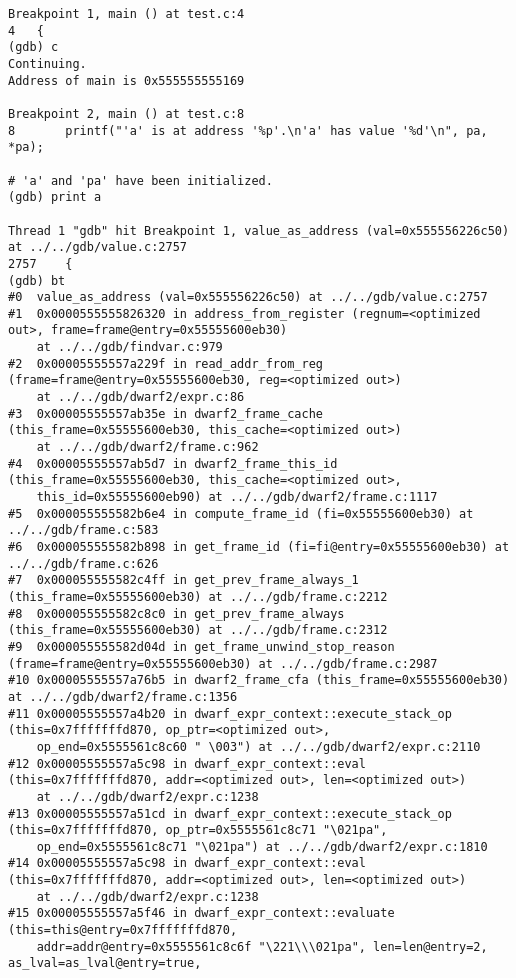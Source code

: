 \documentclass{report}
\begin{document}
\begin{verbatim}
Breakpoint 1, main () at test.c:4
4	{
(gdb) c
Continuing.
Address of main is 0x555555555169

Breakpoint 2, main () at test.c:8
8		printf("'a' is at address '%p'.\n'a' has value '%d'\n", pa, *pa);

# 'a' and 'pa' have been initialized.
(gdb) print a

Thread 1 "gdb" hit Breakpoint 1, value_as_address (val=0x555556226c50) at ../../gdb/value.c:2757
2757	{
(gdb) bt
#0  value_as_address (val=0x555556226c50) at ../../gdb/value.c:2757
#1  0x0000555555826320 in address_from_register (regnum=<optimized out>, frame=frame@entry=0x55555600eb30)
    at ../../gdb/findvar.c:979
#2  0x00005555557a229f in read_addr_from_reg (frame=frame@entry=0x55555600eb30, reg=<optimized out>)
    at ../../gdb/dwarf2/expr.c:86
#3  0x00005555557ab35e in dwarf2_frame_cache (this_frame=0x55555600eb30, this_cache=<optimized out>)
    at ../../gdb/dwarf2/frame.c:962
#4  0x00005555557ab5d7 in dwarf2_frame_this_id (this_frame=0x55555600eb30, this_cache=<optimized out>, 
    this_id=0x55555600eb90) at ../../gdb/dwarf2/frame.c:1117
#5  0x000055555582b6e4 in compute_frame_id (fi=0x55555600eb30) at ../../gdb/frame.c:583
#6  0x000055555582b898 in get_frame_id (fi=fi@entry=0x55555600eb30) at ../../gdb/frame.c:626
#7  0x000055555582c4ff in get_prev_frame_always_1 (this_frame=0x55555600eb30) at ../../gdb/frame.c:2212
#8  0x000055555582c8c0 in get_prev_frame_always (this_frame=0x55555600eb30) at ../../gdb/frame.c:2312
#9  0x000055555582d04d in get_frame_unwind_stop_reason (frame=frame@entry=0x55555600eb30) at ../../gdb/frame.c:2987
#10 0x00005555557a76b5 in dwarf2_frame_cfa (this_frame=0x55555600eb30) at ../../gdb/dwarf2/frame.c:1356
#11 0x00005555557a4b20 in dwarf_expr_context::execute_stack_op (this=0x7fffffffd870, op_ptr=<optimized out>, 
    op_end=0x5555561c8c60 " \003") at ../../gdb/dwarf2/expr.c:2110
#12 0x00005555557a5c98 in dwarf_expr_context::eval (this=0x7fffffffd870, addr=<optimized out>, len=<optimized out>)
    at ../../gdb/dwarf2/expr.c:1238
#13 0x00005555557a51cd in dwarf_expr_context::execute_stack_op (this=0x7fffffffd870, op_ptr=0x5555561c8c71 "\021pa", 
    op_end=0x5555561c8c71 "\021pa") at ../../gdb/dwarf2/expr.c:1810
#14 0x00005555557a5c98 in dwarf_expr_context::eval (this=0x7fffffffd870, addr=<optimized out>, len=<optimized out>)
    at ../../gdb/dwarf2/expr.c:1238
#15 0x00005555557a5f46 in dwarf_expr_context::evaluate (this=this@entry=0x7fffffffd870, 
    addr=addr@entry=0x5555561c8c6f "\221\\\021pa", len=len@entry=2, as_lval=as_lval@entry=true, 

\end{verbatim}
\end{document}

